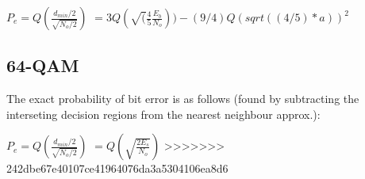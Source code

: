 \documentclass[]{article}
\begin{document}
$ P_e = Q(\frac{d_{min}/2}{\sqrt{N_o/2}}) $
$       = 3Q(\sqrt(\frac{4}{5}\frac{E_b}{N_o}))-(9/4)Q(sqrt((4/5)*a))^2$ 

\subsection{64-QAM}
The exact probability of bit error is as follows (found by subtracting the interseting decision regions from the nearest neighbour approx.):

$ P_e = Q(\frac{d_{min}/2}{\sqrt{N_o/2}}) $
$       = Q(\sqrt{\frac{2E_s}{N_o}}) $ 
>>>>>>> 242dbe67e40107ce41964076da3a5304106ea8d6
\end{document}
